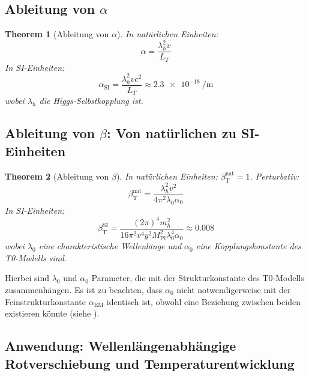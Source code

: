 \documentclass[12pt,a4paper]{article}
\newcommand{\Mpl}{M_{\text{Pl}}}
\newcommand{\alphaEM}{\alpha_{\text{EM}}}
\newcommand{\betaT}{\beta_{\text{T}}}
\newtheorem{theorem}{Theorem}[section]
\begin{document}
	\subsection{Ableitung von \(\alpha\)}
	
	\begin{theorem}[Ableitung von \(\alpha\)]
		In natürlichen Einheiten:
		\begin{equation}
			\alpha = \frac{\lambda_h^2 v}{L_T}
		\end{equation}
		In SI-Einheiten:
		\begin{equation}
			\alpha_{\text{SI}} = \frac{\lambda_h^2 v c^2}{L_T} \approx \SI{2.3e-18}{\per\meter}
		\end{equation}
		wobei \(\lambda_h\) die Higgs-Selbstkopplung ist.
	\end{theorem}
	
	\subsection{Ableitung von \(\beta\): Von natürlichen zu SI-Einheiten}
	
	\begin{theorem}[Ableitung von \(\beta\)]
		In natürlichen Einheiten: \(\betaT^{\text{nat}} = 1\). Perturbativ:
		\begin{equation}
			\betaT^{\text{nat}} = \frac{\lambda_h^2 v^2}{4\pi^2 \lambda_0 \alpha_0}
		\end{equation}
		In SI-Einheiten:
		\begin{equation}
			\betaT^{\text{SI}} = \frac{(2\pi)^4 m_h^2}{16 \pi^2 v^4 y^2 \Mpl^2 \lambda_0^4 \alpha_0} \approx 0.008
		\end{equation}
		wobei \(\lambda_0\) eine charakteristische Wellenlänge und \(\alpha_0\) eine Kopplungskonstante des T0-Modells sind.
	\end{theorem}
	
	Hierbei sind \(\lambda_0\) und \(\alpha_0\) Parameter, die mit der Strukturkonstante des T0-Modells zusammenhängen. Es ist zu beachten, dass \(\alpha_0\) nicht notwendigerweise mit der Feinstrukturkonstante \(\alphaEM\) identisch ist, obwohl eine Beziehung zwischen beiden existieren könnte (siehe \cite{pascher_alphabeta_2025}).
	
	\subsection{Anwendung: Wellenlängenabhängige Rotverschiebung und Temperaturentwicklung}
	
\end{document}
